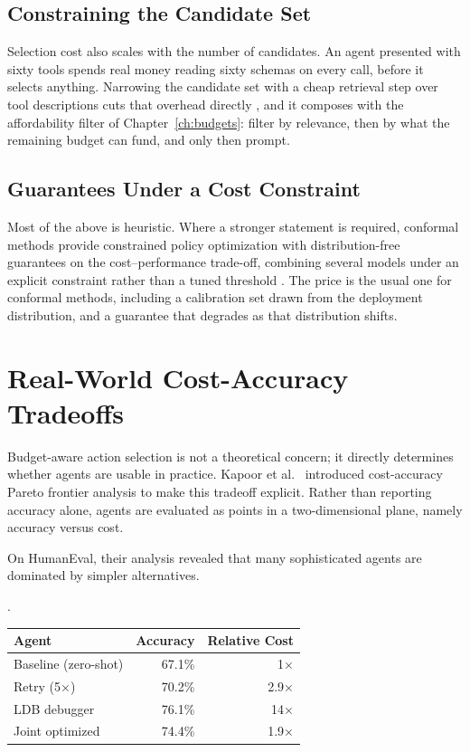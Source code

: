 \subsection{Constraining the Candidate Set}

Selection cost also scales with the number of candidates. An agent presented with
sixty tools spends real money reading sixty schemas on every call, before it
selects anything. Narrowing the candidate set with a cheap retrieval step over
tool descriptions cuts that overhead directly \cite{autotool2026}, and it composes
with the affordability filter of Chapter~\ref{ch:budgets}: filter by relevance,
then by what the remaining budget can fund, and only then prompt.

\subsection{Guarantees Under a Cost Constraint}

Most of the above is heuristic. Where a stronger statement is required, conformal
methods provide constrained policy optimization with distribution-free guarantees
on the cost--performance trade-off, combining several models under an explicit
constraint rather than a tuned threshold \cite{conformalcpo2026}. The price is the
usual one for conformal methods, including a calibration set drawn from the deployment
distribution, and a guarantee that degrades as that distribution shifts.
\section{Real-World Cost-Accuracy Tradeoffs}

Budget-aware action selection is not a theoretical concern; it directly determines whether agents are usable in practice. Kapoor et al.\ \cite{kapoor2024agents} introduced cost-accuracy Pareto frontier analysis to make this tradeoff explicit. Rather than reporting accuracy alone, agents are evaluated as points in a two-dimensional plane, namely accuracy versus cost.

On HumanEval, their analysis revealed that many sophisticated agents are dominated by simpler alternatives.

\begin{center}.
\begin{tabular}{lrr}
\toprule
Agent & Accuracy & Relative Cost \\
\midrule
Baseline (zero-shot) & 67.1\% & 1$\times$ \\
Retry (5$\times$) & 70.2\% & 2.9$\times$ \\
LDB debugger & 76.1\% & 14$\times$ \\
Joint optimized & 74.4\% & 1.9$\times$ \\
\bottomrule
\end{tabular}
\end{center}

